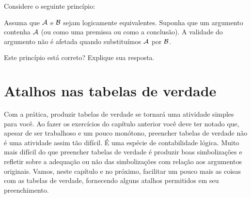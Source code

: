 \problempart 
Considere o seguinte princípio:
	\begin{ebullet}
		\item Assuma que $\mathcal{A}$ e $\mathcal{B}$ sejam logicamente equivalentes.
		Suponha que um argumento contenha $\mathcal{A}$ (ou como uma premissa ou como a conclusão).
		A validade do argumento não é afetada quando substituímos $\mathcal{A}$ por $\mathcal{B}$.
	\end{ebullet}
Este princípio está correto? Explique sua resposta.


\chapter{Atalhos nas tabelas de verdade}
Com a prática, produzir tabelas de verdade se tornará uma atividade simples para você.
Ao fazer os exercícios do capítulo anterior você deve ter notado que, apesar de ser trabalhoso e um pouco monótono, preencher tabelas de verdade não é uma atividade assim tão difícil.
É uma espécie de contabilidade lógica.
Muito mais difícil do que preencher tabelas de verdade é produzir boas simbolizações e refletir sobre a adequação ou não das simbolizações com relação aos argumentos originais.
Vamos, neste capítulo e no próximo, facilitar um pouco mais as coisas com as tabelas de verdade, fornecendo alguns atalhos permitidos em seu preenchimento.

